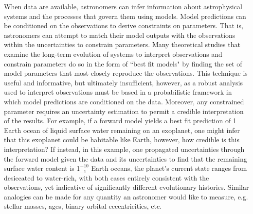 When data are available, astronomers can infer information about astrophysical systems and the processes that govern them using models. Model predictions can be conditioned on the observations to derive constraints on parameters. That is, astronomers can attempt to match their model outputs with the observations within the uncertainties to constrain parameters. Many theoretical studies that examine the long-term evolution of systems to interpret observations and constrain parameters do so in the form of ``best fit models" by finding the set of model parameters that most closely reproduce the observations.  This technique is useful and informative, but ultimately insufficient, however, as a robust analysis used to interpret observations must be based in a probabilistic framework in which model predictions are conditioned on the data. Moreover, any constrained parameter requires an uncertainty estimation to permit a credible interpretation of the results.  For example, if a forward model yields a best fit prediction of 1 Earth ocean of liquid surface water remaining on an exoplanet, one might infer that this exoplanet could be habitable like Earth, however, how credible is this interpretation?  If instead, in this example, one propagated uncertainties through the forward model given the data and its uncertainties to find that the remaining surface water content is 1$^{+10}_{-1}$ Earth oceans, the planet's current state ranges from desiccated to water-rich, with both cases entirely consistent with the observations, yet indicative of significantly different evolutionary histories. Similar analogies can be made for any quantity an astronomer would like to measure, e.g. stellar masses, ages, binary orbital eccentricities, etc.


